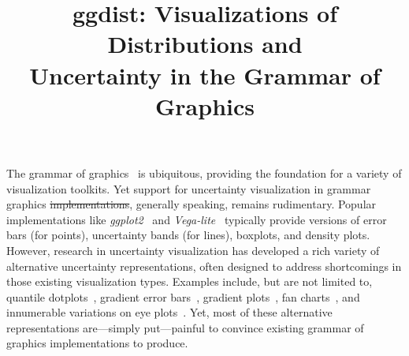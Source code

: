 \documentclass[journal]{vgtc}                     %
\title{ggdist: Visualizations of Distributions and\\Uncertainty in the Grammar of Graphics}
\author{%
  \authororcid{Matthew Kay}{0000-0001-9446-0419}
}
\providecommand{\DIFadd}[1]{{\protect\color{blue}\uwave{#1}}} %
\providecommand{\DIFdel}[1]{{\protect\color{red}\sout{#1}}}                      %
\providecommand{\DIFaddbegin}{} %
\providecommand{\DIFaddend}{} %
\providecommand{\DIFdelbegin}{} %
\providecommand{\DIFdelend}{} %
\begin{document}


\maketitle



The grammar of graphics~\cite{wilkinson2012grammar} is ubiquitous, providing the foundation for a variety of visualization toolkits. Yet support for uncertainty visualization in grammar graphics \DIFdelbegin \DIFdel{implementations}\DIFdelend \DIFaddbegin \DIFadd{systems}\DIFaddend , generally speaking, remains rudimentary. Popular implementations like \textit{ggplot2}~\cite{wickham2010layered,wickham2011ggplot2} and \textit{Vega-lite}~\cite{satyanarayan2016vega} typically provide versions of error bars (for points), uncertainty bands (for lines), boxplots, and density plots. However, research in uncertainty visualization has developed a rich variety of alternative uncertainty representations, often designed to address shortcomings in those existing visualization types. Examples include, but are not limited to, quantile dotplots~\cite{kay2016ish,fernandes2018uncertainty}, gradient error bars~\cite{correll2014error}, gradient plots~\cite{bowman2019graphics,jackson2008displaying}, fan charts~\cite{jackson2008displaying}, and innumerable variations on eye plots~\cite{helske2021can,kay2016ish,barrowman2003raindrop,spiegelhalter1999surgical}. Yet, most of these alternative representations are---simply put---painful to convince existing grammar of graphics implementations to produce.
\end{document}
